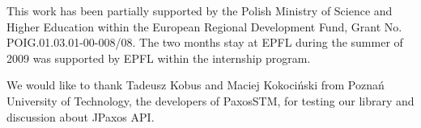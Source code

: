 This work has been partially supported by the Polish Ministry of Science and
Higher Education within the European Regional Development Fund, Grant No.
POIG.01.03.01-00-008/08. The two months stay at EPFL during the summer of 2009
was supported by EPFL within the internship program.

We would like to thank Tadeusz Kobus and Maciej Kokociński from Poznań University
of Technology, the developers of PaxosSTM, for testing our library and
discussion about JPaxos API.

\cleardoublepage

